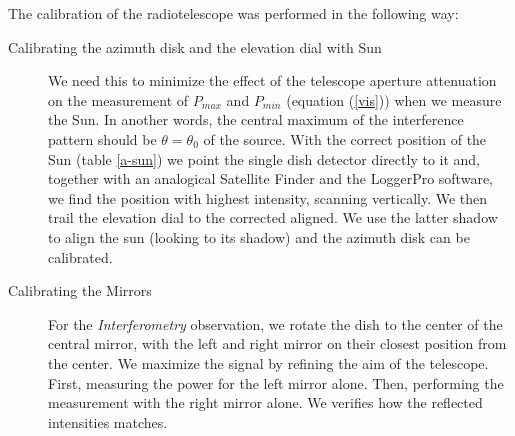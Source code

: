 The calibration of the radiotelescope was performed in the following way:
\begin{description}
 \item [Calibrating the azimuth disk and the elevation dial with Sun]  We need this to minimize the effect of the telescope aperture attenuation on the measurement of $P_{max}$ and $P_{min}$ (equation (\ref{vis})) when we measure the Sun. In another words, the central maximum of the interference pattern should be $\theta = \theta_0$ of the source. With the correct position of the Sun (table \ref{a-sun}) we point the single dish detector directly to it and, together with an analogical Satellite Finder and the LoggerPro software, we find the position with highest intensity, scanning vertically. We then trail the elevation dial to the corrected aligned. We use the latter shadow to align the sun (looking to its shadow) and the azimuth disk can be calibrated.

\item [Calibrating the Mirrors] For the {\it Interferometry} observation, we rotate the dish to the center of the central mirror, with the left and right mirror on their closest position from the center. We maximize the signal by refining the aim of the telescope. First, measuring the power for the left mirror alone. Then, performing the measurement with the right mirror alone. We verifies how the reflected intensities matches. 
\end{description}

 
\bigskip





